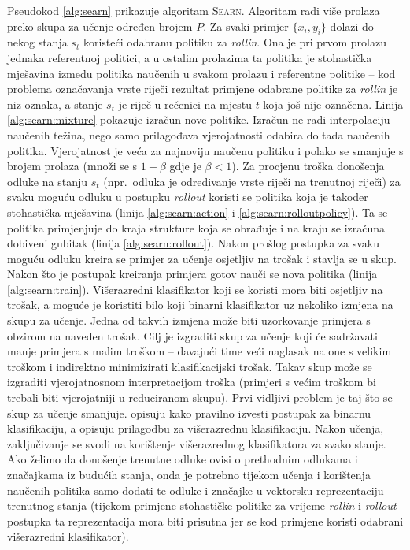 Pseudokod \ref{alg:searn} prikazuje algoritam \textsc{Searn}. Algoritam radi
više prolaza preko skupa za učenje određen brojem $P$. Za svaki primjer $\{x_i,
y_i\}$ dolazi do nekog stanja $s_t$ koristeći odabranu politiku za
\textit{rollin}. Ona je pri prvom prolazu jednaka referentnoj politici, a u
ostalim prolazima ta politika je stohastička mješavina između politika naučenih
u svakom prolazu i referentne politike -- kod problema označavanja vrste riječi
rezultat primjene odabrane politike za \textit{rollin} je niz oznaka, a stanje $s_t$ je
riječ u rečenici na mjestu $t$ koja još nije označena. Linija
\ref{alg:searn:mixture} pokazuje izračun nove politike. Izračun ne radi
interpolaciju naučenih težina, nego samo prilagođava vjerojatnosti odabira do
tada naučenih politika. Vjerojatnost je veća za najnoviju naučenu politiku i
polako se smanjuje s brojem prolaza (množi se s $1-\beta$ gdje je $\beta < 1$).
Za procjenu troška donošenja odluke na stanju $s_t$ (npr.~odluka je određivanje
vrste riječi na trenutnoj riječi) za svaku moguću odluku u postupku \textit{rollout}
koristi se politika koja je također stohastička mješavina (linija
\ref{alg:searn:action} i \ref{alg:searn:rolloutpolicy}). Ta se politika
primjenjuje do kraja strukture koja se obrađuje i na kraju se izračuna dobiveni
gubitak (linija \ref{alg:searn:rollout}). Nakon prošlog postupka za svaku moguću
odluku kreira se primjer za učenje osjetljiv na trošak i stavlja se u skup.
Nakon što je postupak kreiranja primjera gotov nauči se nova politika (linija
\ref{alg:searn:train}). Višerazredni klasifikator koji se koristi mora biti
osjetljiv na trošak, a moguće je koristiti bilo koji binarni klasifikator uz
nekoliko izmjena na skupu za učenje. Jedna od takvih izmjena može biti
uzorkovanje primjera s obzirom na naveden trošak. Cilj je izgraditi skup za
učenje koji će sadržavati manje primjera s malim troškom -- davajući time veći
naglasak na one s velikim troškom i indirektno minimizirati klasifikacijski
trošak. Takav skup može se izgraditi vjerojatnosnom interpretacijom troška
(primjeri s većim troškom bi trebali biti vjerojatniji u reduciranom skupu).
Prvi vidljivi problem je taj što se skup za učenje smanjuje.
\citet{zadrozny2003cost} opisuju kako pravilno izvesti postupak za binarnu
klasifikaciju, a \citet{beygelzimer2005error,beygelzimer2005weighted} opisuju
prilagodbu za višerazrednu klasifikaciju. Nakon učenja, zaključivanje se svodi
na korištenje višerazrednog klasifikatora za svako stanje. Ako želimo da
donošenje trenutne odluke ovisi o prethodnim odlukama i značajkama iz budućih
stanja, onda je potrebno tijekom učenja i korištenja naučenih politika samo
dodati te odluke i značajke u vektorsku reprezentaciju trenutnog stanja (tijekom
primjene stohastičke politike za vrijeme \textit{rollin} i \textit{rollout}
postupka ta reprezentacija mora biti prisutna jer se kod primjene koristi
odabrani višerazredni klasifikator).

